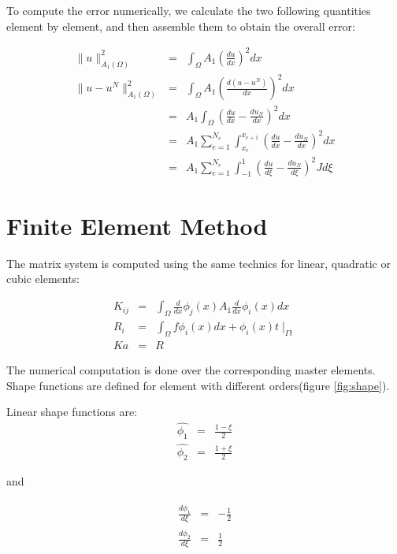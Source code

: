 \documentclass[paper=a4, fontsize=11pt]{article} %
\begin{document}
To compute the error numerically, we calculate the two following quantities element by element, and then assemble them to obtain the overall error:

\begin{eqnarray}
\| u \| _{A_1 (\Omega)}^2 &=&\int_{\Omega} A_1(\frac{du}{dx})^2 dx\nonumber\\
\| u -u^N \| _{A_1(\Omega)} ^2 &=& \int_{\Omega} A_1 (\frac{d(u-u^N)}{dx})^2 dx\nonumber\\
&=& A_1 \int_{\Omega} (\frac{du}{dx} - \frac{du_N}{dx})^2 dx\nonumber\\
&=& A_1 \sum_{e=1}^{N_e} \int_{x_e}^{x_{e+1}} (\frac{du}{dx} - \frac{du_N}{dx})^2 dx \nonumber\\
&=& A_1 \sum_{e=1}^{N_e} \int_{-1}^{1} (\frac{du}{d\xi} - \frac{du_N}{d\xi})^2 J d\xi
\end{eqnarray}




\section{Finite Element Method}

The matrix system is computed using the same technics for linear, quadratic or cubic elements:
 
\begin{eqnarray}
K_{ij} &=& \int_{\Omega} \frac{d}{dx} \phi_j(x) A_1 \frac{d}{dx} \phi_i(x) dx \nonumber\\
R_i &=& \int_{\Omega} f \phi_i(x) dx + \phi_i(x) t \mid _{\Gamma t}\nonumber\\
K a &=& R
\end{eqnarray}

The numerical computation is done over the corresponding master elements. Shape functions are defined for element with different orders(figure \ref{fig:shape}).

Linear shape functions are:
\begin{eqnarray}
\hat{\phi_1} &=& \frac{1-\xi}{2}\nonumber\\
\hat{\phi_2} &=& \frac{1+\xi}{2}
\end{eqnarray}

and

\begin{eqnarray}
\frac{d\hat{\phi_1}}{d\xi} &=& -\frac{1}{2}\nonumber\\
\frac{d\hat{\phi_2}}{d\xi} &=& \frac{1}{2}
\end{eqnarray}
\end{document}
